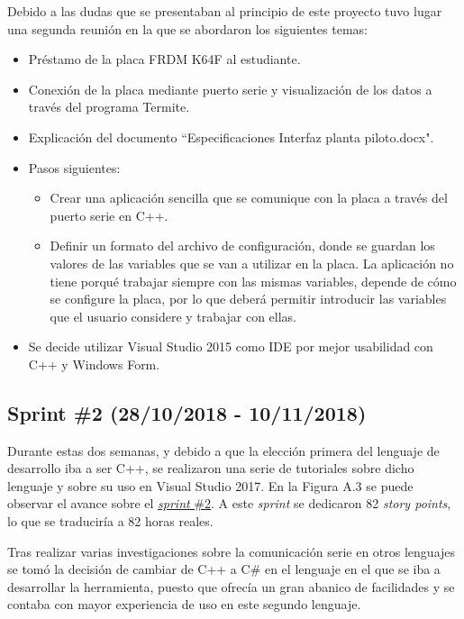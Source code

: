 
Debido a las dudas que se presentaban al principio de este proyecto tuvo lugar una segunda reunión en la que se abordaron los siguientes temas:
\begin{itemize}
	\item Préstamo de la placa FRDM K64F al estudiante.
	\item Conexión de la placa mediante puerto serie y visualización de los datos a través del programa Termite.
	\item Explicación del documento ``Especificaciones Interfaz planta piloto.docx".
	\item Pasos siguientes:
	\begin{itemize}
		\item Crear una aplicación sencilla que se comunique con la placa a través del puerto serie en C++.
		\item Definir un formato del archivo de configuración, donde se guardan los valores de las variables que se van a utilizar en la placa. La aplicación no tiene porqué trabajar siempre con las mismas variables, depende de cómo se configure la placa, por lo que deberá permitir introducir las variables que el usuario considere y trabajar con ellas.
	\end{itemize}
	\item Se decide utilizar Visual Studio 2015 como IDE por mejor usabilidad con C++ y Windows Form.
\end{itemize}

\subsection{Sprint \#2 (28/10/2018 - 10/11/2018)}

Durante estas dos semanas, y debido a que la elección primera del lenguaje de desarrollo iba a ser C++, se realizaron una serie de tutoriales sobre dicho lenguaje y sobre su uso en Visual Studio 2017. En la Figura A.3 se puede observar el avance sobre el \href{https://github.com/FranBurgos/TFG/milestone/3?closed=1}{\textit{sprint} \#2}. A este \textit{sprint} se dedicaron 82 \textit{story points}, lo que se traduciría a 82 horas reales.


Tras realizar varias investigaciones sobre la comunicación serie en otros lenguajes se tomó la decisión de cambiar de C++ a C\# en el lenguaje en el que se iba a desarrollar la herramienta, puesto que ofrecía un gran abanico de facilidades y se contaba con mayor experiencia de uso en este segundo lenguaje.

